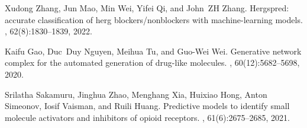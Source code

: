 \documentclass[10pt]{article}
\begin{document}
\begin{thebibliography}{10}
			Xudong Zhang, Jun Mao, Min Wei, Yifei Qi, and John~ZH Zhang.
			\newblock Hergspred: accurate classification of herg blockers/nonblockers with
			machine-learning models.
			, 62(8):1830--1839,
			2022.
			
			Kaifu Gao, Duc~Duy Nguyen, Meihua Tu, and Guo-Wei Wei.
			\newblock Generative network complex for the automated generation of drug-like
			molecules.
			,
			60(12):5682--5698, 2020.
			
			Srilatha Sakamuru, Jinghua Zhao, Menghang Xia, Huixiao Hong, Anton Simeonov,
			Iosif Vaisman, and Ruili Huang.
			\newblock Predictive models to identify small molecule activators and
			inhibitors of opioid receptors.
			, 61(6):2675--2685,
			2021.
			
		\end{thebibliography}
		
		
		
\end{document}
